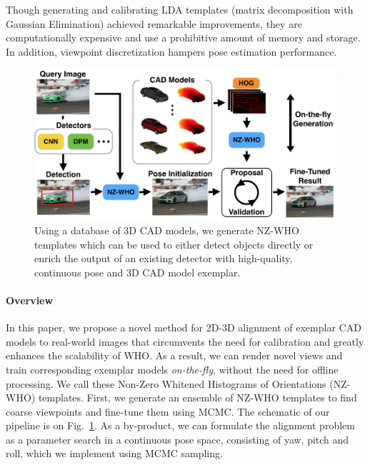 \documentclass[extendedabs]{bmvc2k}
\begin{document}
Though generating and calibrating LDA templates (matrix decomposition with
Gaussian Elimination) achieved remarkable improvements, they are
computationally expensive and use a prohibitive amount of memory and storage.
In addition, viewpoint discretization hampers pose estimation performance.



\begin{figure}[t]
  \centering
  \includegraphics[width=0.9\linewidth]{front} %
  \caption{Using a database of 3D CAD models, we generate NZ-WHO
    templates which can be used to either detect objects directly or
    enrich the output of an existing detector with high-quality,
    continuous pose and 3D CAD model exemplar.}
  \label{fig:front}
\end{figure}


\vspace{-0.1in}
\paragraph{Overview}

In this paper, we propose a novel method for 2D-3D alignment of exemplar CAD
models to real-world images that circumvents the need for calibration and
greatly enhances the scalability of WHO. As a result, we can render novel views
and train corresponding exemplar models {\em on-the-fly}, without the need for
offline processing. We call these Non-Zero Whitened Histograms of Orientations
(NZ-WHO) templates. First, we generate an ensemble of NZ-WHO templates to find
coarse viewpoints and fine-tune them using MCMC. The schematic of our pipeline
is on Fig.~\ref{fig:front}. As a by-product, we can formulate the alignment
problem as a parameter search in a continuous pose space, consisting of yaw,
pitch and roll, which we implement using MCMC sampling.
\end{document}
